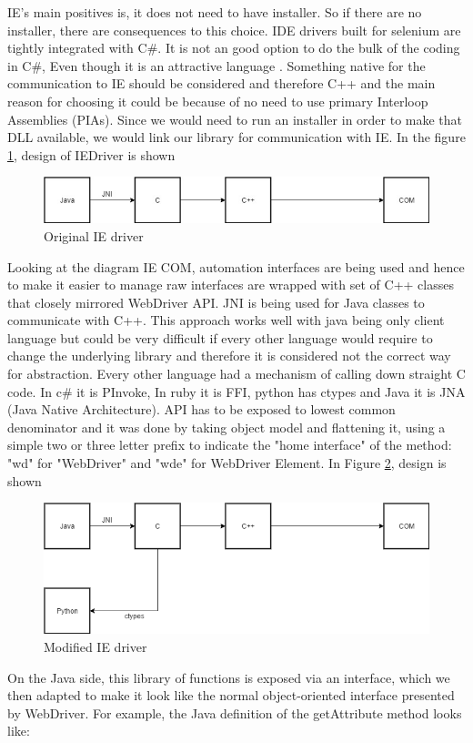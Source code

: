 \documentclass[article,type=msc,colorback,accentcolor=tud9c,twoside,11pt]{tudthesis}
\begin{document}
IE's main positives is, it does not need to have installer. So if there are no installer, there are consequences to this choice. IDE drivers built for selenium are tightly integrated with C\#. It is not an good option to do the bulk of the coding in C\#, Even though it is an attractive language . Something native for the communication to IE should be considered and therefore C++ and the main reason for choosing it could be because of no need to use primary Interloop Assemblies (PIAs). Since we would need to run an installer in order to make that DLL available, we would link our library for communication with IE. In the figure  \ref{fig:OriginalIEdriver}, design of IEDriver is shown 
\begin{figure}[h]
	\centering
	\includegraphics[scale=0.6]{OriginalIEdriver}
	\caption{Original IE driver}
	\label{fig:OriginalIEdriver}
\end{figure}
Looking at the diagram IE COM, automation interfaces are being used and hence to make it easier to manage raw interfaces are wrapped with set of C++ classes that closely mirrored WebDriver API. JNI is being used for Java classes to communicate with C++. This approach works well with java being only client language but could be very difficult if every other language would require to change the underlying library and therefore it is considered not the correct way for abstraction. Every other language had a mechanism of calling down straight C code. In c\# it is PInvoke, In ruby it is FFI, python has ctypes and Java it is JNA (Java Native Architecture). API has to be exposed to lowest common denominator and it was done by taking object model and flattening it, using a simple two or three letter prefix to indicate the "home interface" of the method: "wd" for "WebDriver" and "wde" for WebDriver Element. In Figure 
\ref{fig:ModifiedIEdriver}, design is shown 
\begin{figure}[h]
	\centering
	\includegraphics[scale=0.6]{ModifiedIEdriver.PNG}
	\caption{Modified IE driver}
	\label{fig:ModifiedIEdriver}
\end{figure}
On the Java side, this library of functions is exposed via an interface, which we then adapted to make it look like the normal object-oriented interface presented by WebDriver. For example, the Java definition of the getAttribute method looks like:
\end{document}
